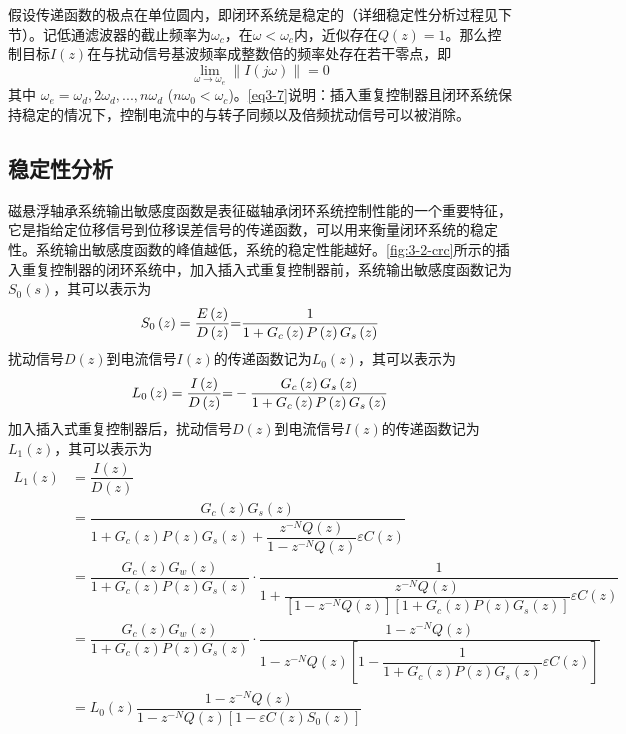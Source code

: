 \documentclass[
  lang=cn,
  degree=master,
  openany,oneside
]{nuaathesis}
\begin{document}
假设传递函数的极点在单位圆内，即闭环系统是稳定的（详细稳定性分析过程见下节）。记低通滤波器的截止频率为$\omega_c $，在$\omega<\omega_c$内，近似存在$Q(z)=1$。那么控制目标$I(z)$在与扰动信号基波频率成整数倍的频率处存在若干零点，即
\begin{equation}
\label{eq3-7}
\mathop {\lim }\limits_{\omega  \to {\omega _e}} \left\| {I\left( {j\omega } \right)} \right\| = 0
\end{equation}
其中 $\omega _e=\omega _d, 2\omega _d,...,n\omega _d$ ($n\omega _0$$<$$\omega _c$)。\autoref{eq3-7}说明：插入重复控制器且闭环系统保持稳定的情况下，控制电流中的与转子同频以及倍频扰动信号可以被消除。
\subsection{稳定性分析}
磁悬浮轴承系统输出敏感度函数是表征磁轴承闭环系统控制性能的一个重要特征，它是指给定位移信号到位移误差信号的传递函数，可以用来衡量闭环系统的稳定性。系统输出敏感度函数的峰值越低，系统的稳定性能越好。\autoref{fig:3-2-crc}所示的插入重复控制器的闭环系统中，加入插入式重复控制器前，系统输出敏感度函数记为$S_0(s)$，其可以表示为
\begin{equation}
{S_0}\left( z \right) = {{E\left( z \right)} \over {D\left( z \right)}}{\rm{ = }}{1 \over {1 + {G_c}\left( z \right)P\left( z \right){G_s}\left( z \right)}}
\end{equation}
扰动信号$D(z)$到电流信号$I(z)$的传递函数记为$L_0(z)$，其可以表示为
\begin{equation}
{L_0}\left( z \right) = {{I\left( z \right)} \over {D\left( z \right)}}{\rm{ = }} - {{{G_c}\left( z \right){G_s}\left( z \right)} \over {1 + {G_c}\left( z \right)P\left( z \right){G_s}\left( z \right)}}
\end{equation}
加入插入式重复控制器后，扰动信号$D(z)$到电流信号$I(z)$的传递函数记为$L_1(z)$，其可以表示为
\begin{equation}
\label{eq3-10}
\begin{aligned}
L_1(z)
&=\dfrac{I(z)}{D(z)}\\
&=\dfrac{G_c(z)G_s(z)}{1+G_c(z)P(z)G_s(z)+\dfrac{z^{-N}Q(z)}{1-z^{-N}Q(z)}\varepsilon C(z)}\\
&=\dfrac{G_c(z)G_w(z)}{1+G_c(z)P(z)G_s(z)}\cdot \dfrac{1}{1+\dfrac{z^{-N}Q(z)}{[1-z^{-N}Q(z)][1+G_c(z)P(z)G_s(z)]}\varepsilon C(z)}\\
&=\dfrac{G_c(z)G_w(z)}{1+G_c(z)P(z)G_s(z)}\cdot \dfrac{1-z^{-N}Q(z)}{1-z^{-N}Q(z)\left[1-\dfrac{1}{1+G_c(z)P(z)G_s(z)}\varepsilon C(z)\right]}\\
&=L_0(z)\dfrac{1-z^{-N}Q(z)}{1-z^{-N}Q(z)[1-\varepsilon C(z)S_0(z)]}
\end{aligned}
\end{equation}
\end{document}
